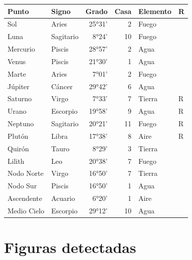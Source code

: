 \documentclass[11pt,a4paper]{article}
\begin{document}
\begin{center}
\begin{tabular}{llrrll}
  \toprule
  \textbf{Punto} & \textbf{Signo} & \textbf{Grado} & \textbf{Casa} &
  \textbf{Elemento} & \textbf{R} \\
  \midrule
  Sol & Aries & 25°31' & 2 & Fuego &  \\
  Luna & Sagitario & 8°24' & 10 & Fuego &  \\
  Mercurio & Piscis & 28°57' & 2 & Agua &  \\
  Venus & Piscis & 21°30' & 1 & Agua &  \\
  Marte & Aries & 7°01' & 2 & Fuego &  \\
  Júpiter & Cáncer & 29°42' & 6 & Agua &  \\
  Saturno & Virgo & 7°33' & 7 & Tierra & R \\
  Urano & Escorpio & 19°58' & 9 & Agua & R \\
  Neptuno & Sagitario & 20°21' & 11 & Fuego & R \\
  Plutón & Libra & 17°38' & 8 & Aire & R \\
  Quirón & Tauro & 8°29' & 3 & Tierra &  \\
  Lilith & Leo & 20°38' & 7 & Fuego &  \\
  Nodo Norte & Virgo & 16°50' & 7 & Tierra &  \\
  Nodo Sur & Piscis & 16°50' & 1 & Agua &  \\
  Ascendente & Acuario & 6°20' & 1 & Aire &  \\
  Medio Cielo & Escorpio & 29°12' & 10 & Agua &  \\
  \bottomrule
\end{tabular}
\end{center}

\newpage

\section{Figuras detectadas}
\end{document}
